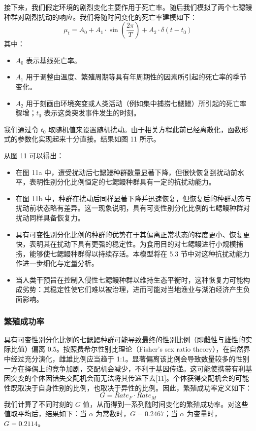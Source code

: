 \documentclass[11pt,a4paper]{ctexart}
\begin{document}
接下来，我们假定环境的剧烈变化主要作用于死亡率。随后我们模拟了两个七鳃鳗种群对剧烈扰动的响应。我们将随时间变化的死亡率建模如下：
\begin{equation}
\mu_t=A_0+A_1\cdot\sin\left(\frac{2\pi}{T}\right)+A_2\cdot\delta\left(t-t_0\right) \tag{15}
\end{equation}
其中：

\begin{itemize}
\item $A_0$ 表示基线死亡率。
\item $A_1$ 用于调整由温度、繁殖周期等具有年周期性的因素所引起的死亡率的季节变化。
\item $A_2$ 用于刻画由环境突变或人类活动（例如集中捕捞七鳃鳗）所引起的死亡率骤增；$t_0$ 表示这类突发事件发生的时刻。
\end{itemize}

我们通过令 $t_0$ 取随机值来设置随机扰动。由于相关方程此前已经离散化，函数形式的参数化实现起来十分直接。结果如图 11 所示。

从图 11 可以得出：

\begin{itemize}
\item 在图 11a 中，遭受扰动后七鳃鳗种群数量显著下降，但很快恢复到扰动前水平，表明性别分化比例恒定的七鳃鳗种群具有一定的抗扰动能力。
\item 在图 11b 中，种群在扰动后同样显著下降并迅速恢复，但恢复后的种群动态与扰动前状态略有差异。这一现象说明，具有可变性别分化比例的七鳃鳗种群对扰动同样具备恢复力。
\item 具有可变性别分化比例的种群的优势在于其偏离正常状态的程度更小、恢复更快，表明其在扰动下具有更强的稳定性。为食用目的对七鳃鳗进行小规模捕捞，能够使七鳃鳗种群得以持续存活。本模型将在 5.3 节中对这种抗扰动能力作进一步细化与定量分析。
\item 当人类干预旨在控制入侵性七鳃鳗种群以维持生态平衡时，这种恢复力可能构成劣势：其稳定性使它们难以被治理，进而可能对当地渔业与湖泊经济产生负面影响。
\end{itemize}

\subsubsection{繁殖成功率}

具有可变性别分化比例的七鳃鳗种群可能导致最终的性别比例（即雌性与雄性的实际比值）偏离 0.5。按照费希尔性别比理论（Fisher's sex ratio theory），在自然界中经过充分演化，雌雄比例应当趋于 1:1。显著偏离该比例会导致数量较多的性别一方在择偶上的竞争加剧，交配机会减少，不利于基因传递。这可能使携带有利基因突变的个体因错失交配机会而无法将其传递下去[11]。个体获得交配机会的可能性既取决于自身性别的比例，也取决于异性的比例。因此，繁殖成功率定义如下：
\begin{equation}
G=Rate_F\cdot Rate_M \tag{16}
\end{equation}
我们计算了不同时刻的 $G$ 值，从而得到一系列随时间变化的繁殖成功率。对这些值取平均后，结果如下：当 $\alpha$ 为常数时，$G=0.2467$；当 $\alpha$ 为变量时，$G=0.2114$。
\end{document}
